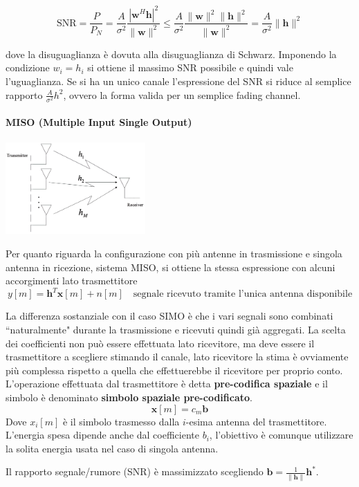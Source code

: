 \[
    \text{SNR} = \frac{P}{P_N} = \frac{A}{\sigma^2} \frac{\left| \mathbf{w}^H \mathbf{h} \right|^2}{\|\mathbf{w}\|^2} \leq \frac{A}{\sigma^2} \frac{\|\mathbf{w}\|^2 \|\mathbf{h}\|^2}{\|\mathbf{w}\|^2} = \frac{A}{\sigma^2} \|\mathbf{h}\|^2 
\]

dove la disuguaglianza è dovuta alla disuguaglianza di Schwarz. 
Imponendo la condizione $w_i = h_i$ si ottiene il massimo SNR possibile e quindi vale l'uguaglianza.
Se si ha un unico canale l'espressione del SNR si riduce al semplice rapporto $\frac{A}{\sigma^2}h^2$, ovvero la forma valida per un semplice fading channel.
\paragraph*{MISO (Multiple Input Single Output)}
\begin{center}
    \includegraphics[width=0.4\textwidth]{imgs/miso.jpg}
\end{center}
Per quanto riguarda la configurazione con più antenne in trasmissione e singola antenna in ricezione, sistema MISO, si ottiene la stessa espressione con alcuni accorgimenti lato trasmettitore
\[
    y[m] = \mathbf{h}^T \mathbf{x}[m] + n[m] \quad \text{segnale ricevuto tramite l'unica antenna disponibile}
\]

La differenza sostanziale con il caso SIMO è che i vari segnali sono combinati ``naturalmente" durante la trasmissione e ricevuti quindi già aggregati. 
La scelta dei coefficienti non può essere effettuata lato ricevitore, ma deve essere il trasmettitore a scegliere stimando il canale, lato ricevitore la stima è ovviamente più complessa rispetto a quella che effettuerebbe il ricevitore per proprio conto.
L'operazione effettuata dal trasmettitore è detta \textbf{pre-codifica spaziale} e il simbolo è denominato \textbf{simbolo spaziale pre-codificato}.
\[
    \mathbf{x}[m] = c_m \mathbf{b} 
\]
Dove $x_i[m]$ è il simbolo trasmesso dalla $i$-esima antenna del trasmettitore.
L'energia spesa dipende anche dal coefficiente $b_i$, l'obiettivo è comunque utilizzare la solita energia usata nel caso di singola antenna.

Il rapporto segnale/rumore (SNR) è massimizzato scegliendo $\mathbf{b} = \frac{1}{\| \mathbf{h} \|} \mathbf{h}^*$.

